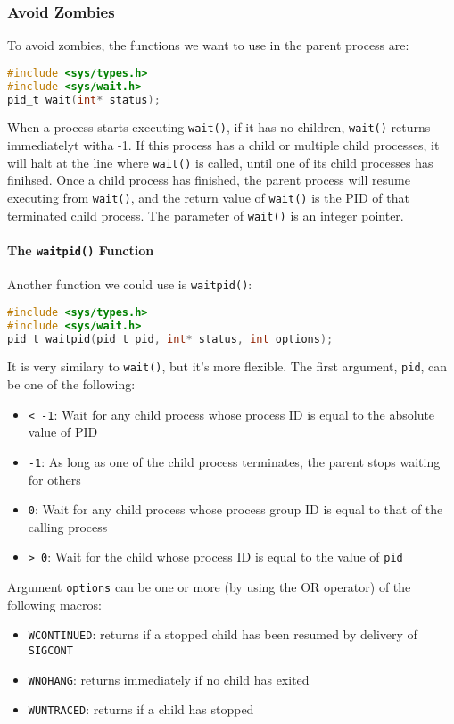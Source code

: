 \documentclass{article}
\renewcommand{\b}{\item[$\circ$]}
\newcommand{\newlist}{\begin{itemize}}
\renewcommand{\endlist}{\end{itemize}}
\newcommand{\code}[1]{\texttt{#1}}
\begin{document}
\subsubsection{Avoid Zombies}

To avoid zombies, the functions we want to use in the parent process are:

\begin{lstlisting}[language=c]
#include <sys/types.h>
#include <sys/wait.h>
pid_t wait(int* status);
\end{lstlisting}

\noindent When a process starts executing \code{wait()}, if it has no children, \code{wait()} returns immediatelyt witha  -1. If this process has a child or multiple child processes, it will halt at the line where \code{wait()} is called, until one of its child processes has finihsed. Once a child process has finished, the parent process will resume executing from \code{wait()}, and the return value of \code{wait()} is the PID of that terminated child process. The parameter of \code{wait()} is an integer pointer. 

\paragraph{The \code{waitpid()} Function}

Another function we could use is \code{waitpid()}:

\begin{lstlisting}[language=c]
#include <sys/types.h>
#include <sys/wait.h>
pid_t waitpid(pid_t pid, int* status, int options);
\end{lstlisting}

\noindent It is very similary to \code{wait()}, but it's more flexible. The first argument, \code{pid}, can be one of the following:

\newlist
\b \code{< -1}: Wait for any child process whose process ID is equal to the absolute value of PID
\b \code{-1}: As long as one of the child process terminates, the parent stops waiting for others
\b \code{0}: Wait for any child process whose process group ID is equal to that of the calling process
\b \code{> 0}: Wait for the child whose process ID is equal to the value of \code{pid}
\endlist

\noindent Argument \code{options} can be one or more (by using the OR operator) of the following macros:

\newlist
\b \code{WCONTINUED}: returns if a stopped child has been resumed by delivery of \code{SIGCONT}
\b \code{WNOHANG}: returns immediately if no child has exited
\b \code{WUNTRACED}: returns if a child has stopped
\endlist
\end{document}

